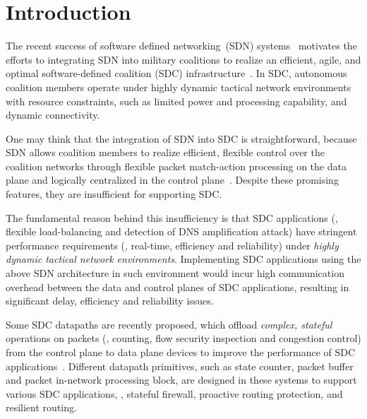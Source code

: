 \section{Introduction}\label{sec:intro}
The recent success of software defined networking~(SDN) systems~\cite{swan, b4,
edgefabric} motivates the efforts to integrating SDN into military coalitions to
realize an efficient, agile, and optimal software-defined coalition (SDC)
infrastructure~\cite{vinod-sdc}. In SDC, autonomous coalition members operate
under highly dynamic tactical network environments with resource constraints,
such as limited power and processing capability, and dynamic connectivity. 

One may think that the integration of SDN into SDC is straightforward, because SDN
allows coalition members to realize efficient, flexible control over the
coalition networks through flexible packet match-action processing on the data
plane and logically centralized in the control plane~\cite{p4, rmt}.
Despite these promising features, they are insufficient for supporting SDC.

The fundamental reason behind this insufficiency is that SDC applications (\eg,
flexible load-balancing and detection of DNS amplification attack) have
stringent performance requirements (\eg, real-time, efficiency and reliability) 
under \textit{highly dynamic tactical network environments}. Implementing SDC
applications using the above SDN architecture in such environment would incur high communication overhead
between the data and control planes of SDC applications, resulting in
significant delay, efficiency and reliability issues.

Some SDC datapaths are recently proposed, which offload \textit{complex,
stateful} operations on packets (\eg, counting, flow security inspection and
congestion control) from the control plane to data plane
devices to improve the performance of SDC
applications~\cite{bianchi2014openstate, opensdc}.  Different datapath primitives, such as state
counter, packet buffer and packet in-network processing block, are designed in
these systems to support various SDC applications, \eg, stateful firewall,
proactive routing protection, and resilient routing. 

